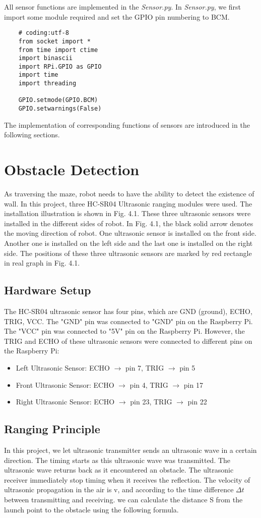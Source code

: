 \documentclass[11pt,times,oneside,openright,hardcopy]{eeereport}
\begin{document}
All sensor functions are implemented in the \textit{Sensor.py}. In \textit{Sensor.py}, we first import some module required and set the GPIO pin numbering to BCM.
\begin{lstlisting}
	# coding:utf-8
	from socket import *
	from time import ctime
	import binascii
	import RPi.GPIO as GPIO
	import time
	import threading
	
	GPIO.setmode(GPIO.BCM)
	GPIO.setwarnings(False)
\end{lstlisting}
The implementation of corresponding functions of sensors are introduced in the following sections.

\section{Obstacle Detection}
As traversing the maze, robot needs to have the ability to detect the existence of wall. In this project, three HC-SR04 Ultrasonic ranging modules were used.
The installation illustration is shown in Fig. 4.1. These three ultrasonic sensors were installed in the different sides of robot.
In Fig. 4.1, the black solid arrow denotes the moving direction of robot. One ultrasonic sensor is installed on the front side. Another one is installed on the left side and the last one is installed on the right side.
The positions of these three ultrasonic sensors are marked by red rectangle in real graph in Fig. 4.1.
\subsection{Hardware Setup}
The HC-SR04 ultrasonic sensor has four pins, which are GND (ground), ECHO, TRIG, VCC. The "GND" pin was connected to "GND" pin on the Raspberry Pi.
The "VCC" pin was connected to "5V" pin on the Raspberry Pi. However, the TRIG and ECHO of these ultrasonic sensors were connected to different pins on the Raspberry Pi:
\begin{itemize}
    \item Left Ultrasonic Sensor: ECHO $\rightarrow$ pin 7, TRIG $\rightarrow$ pin 5
    \item Front Ultrasonic Sensor: ECHO $\rightarrow$ pin 4, TRIG $\rightarrow$ pin 17
    \item Right Ultrasonic Sensor: ECHO $\rightarrow$ pin 23, TRIG $\rightarrow$ pin 22
\end{itemize}
\subsection{Ranging Principle}
In this project, we let ultrasonic transmitter sends an ultrasonic wave in a certain direction. 
The timing starts as this ultrasonic wave was transmitted. The ultrasonic wave returns back as it encountered an obstacle.
The ultrasonic receiver immediately stop timing when it receives the reflection.
The velocity of ultrasonic propagation in the air is v, and according to the time difference $\Delta t$ between transmitting and receiving.
we can calculate the distance S from the launch point to the obstacle using the following formula.
\end{document}
